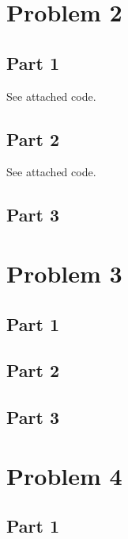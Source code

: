 \documentclass[12pt]{article}
\begin{document}
\section{Problem 2}

\subsection{Part 1}

See attached code.

\subsection{Part 2}

See attached code.

\subsection{Part 3}


\section{Problem 3}

\subsection{Part 1}


\subsection{Part 2}


\subsection{Part 3}


\section{Problem 4}

\subsection{Part 1}

\end{document}
